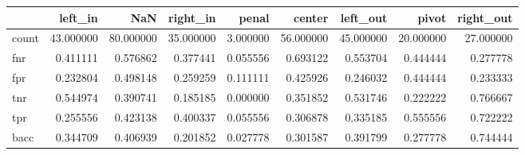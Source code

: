 \begin{tabular}{lrrrrrrrr}
\toprule
{} &    left\_in &        NaN &   right\_in &     penal &     center &   left\_out &      pivot &  right\_out \\
\midrule
count &  43.000000 &  80.000000 &  35.000000 &  3.000000 &  56.000000 &  45.000000 &  20.000000 &  27.000000 \\
fnr   &   0.411111 &   0.576862 &   0.377441 &  0.055556 &   0.693122 &   0.553704 &   0.444444 &   0.277778 \\
fpr   &   0.232804 &   0.498148 &   0.259259 &  0.111111 &   0.425926 &   0.246032 &   0.444444 &   0.233333 \\
tnr   &   0.544974 &   0.390741 &   0.185185 &  0.000000 &   0.351852 &   0.531746 &   0.222222 &   0.766667 \\
tpr   &   0.255556 &   0.423138 &   0.400337 &  0.055556 &   0.306878 &   0.335185 &   0.555556 &   0.722222 \\
bacc  &   0.344709 &   0.406939 &   0.201852 &  0.027778 &   0.301587 &   0.391799 &   0.277778 &   0.744444 \\
\bottomrule
\end{tabular}
